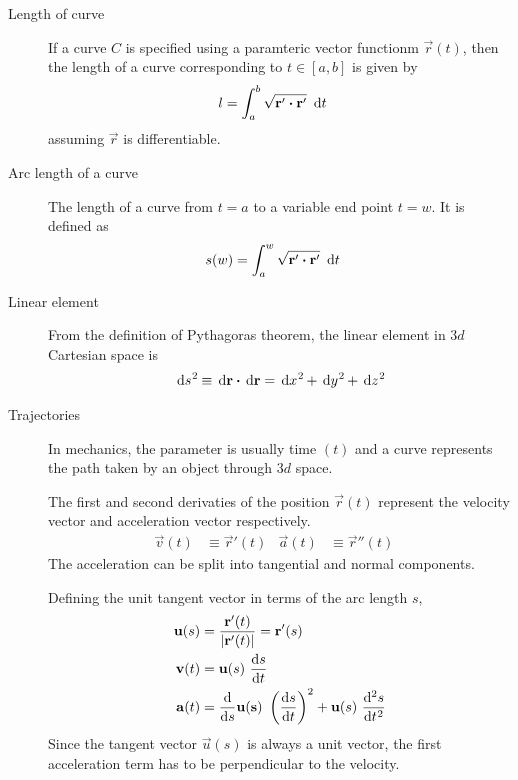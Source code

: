 \begin{description}
    \item[Length of curve] If a curve $ C $ is specified using a paramteric vector
        functionm $ \vec{r}(t) $, then the length of a curve corresponding to
        $ t \in [a,b] $ is given by
        \begin{align}
            l & = \int_{a}^{b} \sqrt{\vec{r}' \dotp \vec{r}'}\ \dl t
        \end{align}
        assuming $ \vec{r} $ is differentiable.

    \item[Arc length of a curve] The length of a curve from $ t = a $ to a variable end
        point $ t = w $. It is defined as
        \begin{align}
            s(w) & = \int_{a}^{w} \sqrt{\vec{r}' \dotp \vec{r}'}\ \dl t
        \end{align}

    \item[Linear element] From the definition of Pythagoras theorem, the linear element
        in $ 3d $ Cartesian space is
        \begin{align}
            \dl s^2 \equiv \vec{\dl r} \dotp  \vec{\dl r}
            = \dl x^2 + \dl y^2 + \dl z^2
        \end{align}

    \item[Trajectories] In mechanics, the parameter is usually time $ (t) $ and a curve
        represents the path taken by an object through $ 3d $ space. \par
        The first and second derivaties of the position $ \vec{r}(t) $ represent the
        velocity vector and acceleration vector respectively.
        \begin{align}
            \vec{v}(t) & \equiv \vec{r}'(t)  &
            \vec{a}(t) & \equiv \vec{r}''(t) &
        \end{align}
        The acceleration can be split into tangential and normal components. \par
        Defining the unit tangent vector in terms of the arc length $ s $,
        \begin{align}
            \vec{u}(s) & = \frac{\vec{r}'(t)}{\abs{\vec{r}'(t)}} = \vec{r}'(s) \\
            \vec{v}(t) & = \vec{u}(s)\ \diff st                                \\
            \vec{a}(t) & = \diff*{\vec{u(s)}}{s}\ \left( \diff st \right)^2 +
            \vec{u}(s)\ \diff[2] st                                            \\
        \end{align}
        Since the tangent vector $ \vec{u}(s) $ is always a unit vector, the first
        acceleration term has to be perpendicular to the velocity.


\end{description}
